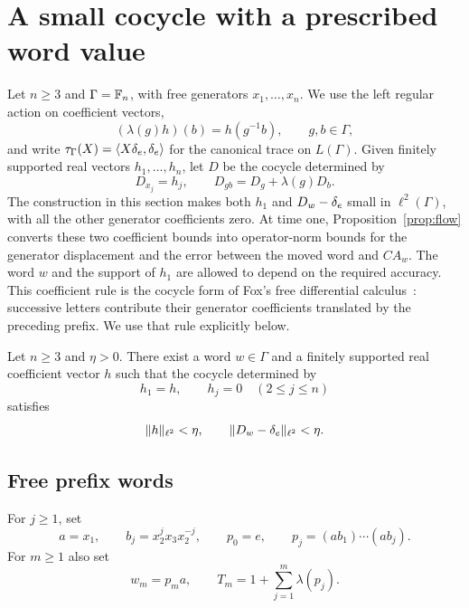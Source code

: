 \section{A small cocycle with a prescribed word value}
\label{sec:cocycle}

Let $n\geq 3$ and $\Gamma=\mathbb F_n$, with free generators
$x_1,\ldots,x_n$.  We use the left regular action on coefficient
vectors,
\[
  (\lambda(g)h)(b)=h(g^{-1}b),
  \qquad g,b\in\Gamma,
\]
and write $\tau_\Gamma(X)=\langle X\delta_e,\delta_e\rangle$ for the canonical
trace on $L(\Gamma)$.  Given finitely supported real vectors
$h_1,\ldots,h_n$, let $D$ be the cocycle determined by
\[
  D_{x_j}=h_j,
  \qquad D_{gb}=D_g+\lambda(g)D_b.
\]
The construction in this section makes both $h_1$ and
$D_w-\delta_e$ small in $\ell^2(\Gamma)$, with all the other generator
coefficients zero. At time one, Proposition~\ref{prop:flow} converts
these two coefficient bounds into operator-norm bounds for the generator
displacement and the error between the moved word and $CA_w$.
The word $w$ and the support of $h_1$ are allowed to depend on the
required accuracy.
This coefficient rule is the cocycle form of Fox's free differential
calculus~\cite[Section~1, equations~$(1.2)'$, (1.5)--(1.6), and
Section~2, equations~(2.1)--(2.2)]{fox1953}:
successive letters contribute their generator coefficients translated
by the preceding prefix.  We use that rule explicitly below.

\begin{lemma}
\label{lem:small-cocycle}
Let $n\geq 3$ and $\eta>0$.
There exist a word $w\in\Gamma$ and a finitely supported real
coefficient vector $h$ such that the cocycle determined by
\[
  h_1=h,\qquad h_j=0\quad(2\leq j\leq n)
\]
satisfies
\begin{equation}
\label{eq:small-cocycle}
  \|h\|_{\ell^2}<\eta,
  \qquad
  \|D_w-\delta_e\|_{\ell^2}<\eta.
\end{equation}
\end{lemma}

\subsection{Free prefix words}

For $j\geq 1$, set
\begin{equation}
\label{eq:cocycle-prefixes}
  a=x_1,
  \qquad b_j=x_2^j x_3 x_2^{-j},
  \qquad p_0=e,
  \qquad p_j=(a b_1)\cdots(a b_j).
\end{equation}
For $m\geq 1$ also set
\begin{equation}
\label{eq:cocycle-word-operator}
  w_m=p_m a,
  \qquad T_m=1+\sum_{j=1}^m\lambda(p_j).
\end{equation}

